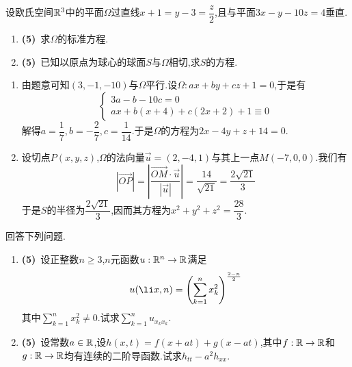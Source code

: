 \documentclass{ctexart}
\begin{document}
\begin{problem}[2.(10\songti{分})]
    设欧氏空间$\mathbb{R}^3$中的平面$\Omega$过直线$x+1=y-3=\dfrac{z}2$,且与平面$3x-y-10z=4$垂直.
    \begin{enumerate}[label=\tbf{(\arabic*)}]
        \item \textbf{(5)}\ 求$\Omega$的标准方程.
        \item \textbf{(5)}\ 已知以原点为球心的球面$S$与$\Omega$相切,求$S$的方程.
    \end{enumerate}
\end{problem}
\begin{solution}
    \begin{enumerate}[label=\tbf{(\arabic*)}]
        \item 由题意可知$(3,-1,-10)$与$\Omega$平行.设$\Omega:ax+by+cz+1=0$,于是有
            \[\left\{\begin{array}{l}
                3a-b-10c=0\\
                ax+b(x+4)+c(2x+2)+1\equiv0
            \end{array}\right.\]
            解得$a=\dfrac17,b=-\dfrac27,c=\dfrac1{14}$.于是$\Omega$的方程为$2x-4y+z+14=0$.
        \item 设切点$P(x,y,z)$,$\Omega$的法向量$\vec{u}=(2,-4,1)$与其上一点$M(-7,0,0)$.我们有
            \[\left|\overrightarrow{OP}\right|=\left|\dfrac{\overrightarrow{OM}\cdot\vec{u}}{|\vec{u}|}\right|=\dfrac{14}{\sqrt{21}}=\dfrac{2\sqrt{21}}{3}\]
            于是$S$的半径为$\dfrac{2\sqrt{21}}{3}$,因而其方程为$x^2+y^2+z^2=\dfrac{28}{3}$.
    \end{enumerate}
\end{solution}
\begin{problem}[3.(10\songti{分})]
    回答下列问题.
    \begin{enumerate}[label=\tbf{(\arabic*)}]
        \item \textbf{(5)}\ 设正整数$n\geqslant3$,$n$元函数$u:\mathbb{R}^n\to\mathbb{R}$满足
            \[u(\li x,n)=\left(\sum_{k=1}^nx_k^2\right)^{\frac{2-n}{2}}\]
            其中$\displaystyle\sum_{k=1}^nx_k^2\neq0$.试求$\displaystyle\sum_{k=1}^{n}u_{x_kx_k}$.
        \item \textbf{(5)}\ 设常数$a\in\mathbb{R}$,设$h(x,t)=f(x+at)+g(x-at)$,其中$f:\mathbb{R}\to\mathbb{R}$和$g:\mathbb{R}\to\mathbb{R}$均有连续的二阶导函数.试求$h_{tt}-a^2h_{xx}$.
    \end{enumerate}
\end{problem}
\end{document}
